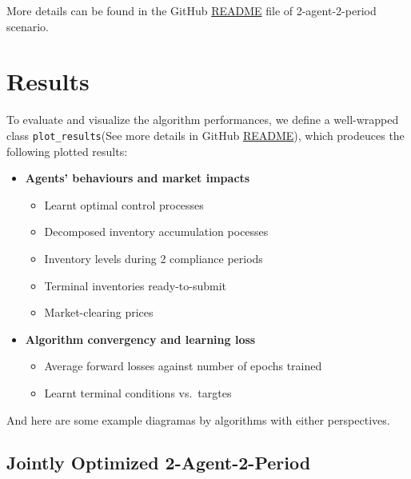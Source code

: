\documentclass{article}
\begin{document}
More details can be found in the GitHub \href{https://github.com/OrangeAoo/PA-MFG-FBSDE/blob/3cffc5e8dbe09fbc880f6c2c70d76e0b6a1b8c3c/2Period/Joint_Optim_2Prdx1/README.md}\textsc{{README}} file of 2-agent-2-period scenario.

\hypertarget{results}{%
\section{Results}\label{results}

To evaluate and visualize the algorithm performances, we define a
well-wrapped class \texttt{plot\_results}(See more details in
GitHub \href{https://github.com/OrangeAoo/PA-MFG-FBSDE/blob/3cffc5e8dbe09fbc880f6c2c70d76e0b6a1b8c3c/2Period/Joint_Optim_2Prdx1/README.md}\textsc{{README}}), which prodeuces
the following plotted results:

\begin{itemize}
\tightlist
\item
  \textbf{Agents' behaviours and market impacts}

  \begin{itemize}
  \tightlist
  \item
    Learnt optimal control processes
  \item
    Decomposed inventory accumulation pocesses
  \item
    Inventory levels during 2 compliance periods
  \item
    Terminal inventories ready-to-submit
  \item
    Market-clearing prices
  \end{itemize}
\item
  \textbf{Algorithm convergency and learning loss}

  \begin{itemize}
  \tightlist
  \item
    Average forward losses against number of epochs trained
  \item
    Learnt terminal conditions vs.~targtes
  \end{itemize}
\end{itemize}

And here are some example diagramas by algorithms with either
perspectives.

\hypertarget{jointly-optimized-2-agent-2-period}{%
\subsection{Jointly Optimized
2-Agent-2-Period}\label{jointly-optimized-2-agent-2-period}}

}
\end{document}
